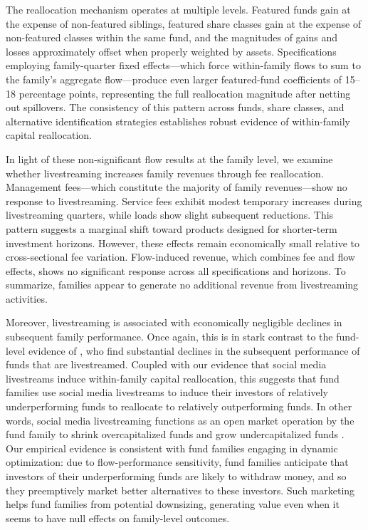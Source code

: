 \documentclass[12pt]{article}
\begin{document}
The reallocation mechanism operates at multiple levels. Featured funds gain at the expense of non-featured siblings, featured share classes gain at the expense of non-featured classes within the same fund, and the magnitudes of gains and losses approximately offset when properly weighted by assets. Specifications employing family-quarter fixed effects—which force within-family flows to sum to the family's aggregate flow—produce even larger featured-fund coefficients of 15--18 percentage points, representing the full reallocation magnitude after netting out spillovers. The consistency of this pattern across funds, share classes, and alternative identification strategies establishes robust evidence of within-family capital reallocation.

In light of these non-significant flow results at the family level, we examine whether livestreaming increases family revenues through fee reallocation. Management fees---which constitute the majority of family revenues---show no response to livestreaming. Service fees exhibit modest temporary increases during livestreaming quarters, while loads show slight subsequent reductions. This pattern suggests a marginal shift toward products designed for shorter-term investment horizons. However, these effects remain economically small relative to cross-sectional fee variation. Flow-induced revenue, which combines fee and flow effects, shows no significant response across all specifications and horizons. To summarize, families appear to generate no additional revenue from livestreaming activities.

Moreover, livestreaming is associated with economically negligible declines in subsequent family performance. Once again, this is in stark contrast to the fund-level evidence of \citet{dehaan2021obfuscation}, who find substantial declines in the subsequent performance of funds that are livestreamed. Coupled with our evidence that social media livestreams induce within-family capital reallocation, this suggests that fund families use social media livestreams to induce their investors of relatively underperforming funds to reallocate to relatively outperforming funds. In other words, social media livestreaming functions as an open market operation by the fund family to shrink overcapitalized funds and grow undercapitalized funds \citep{berk2017}. Our empirical evidence is consistent with fund families engaging in dynamic optimization: due to flow-performance sensitivity, fund families anticipate that investors of their underperforming funds are likely to withdraw money, and so they preemptively market better alternatives to these investors. Such marketing helps fund families from potential downsizing, generating value even when it seems to have null effects on family-level outcomes.
\end{document}
